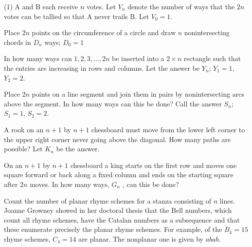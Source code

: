 \documentclass[10pt,]{book}
\theoremstyle{plain}
\theoremstyle{definition}
\theoremstyle{definition}
\theoremstyle{definition}
\theoremstyle{definition}
\numberwithin{equation}{chapter}
\begin{document}
\begin{exercisegroup}(1)
\exercise[13.] \hypertarget{exercise-63}{}
\hypertarget{p-823}{}%
A and B each receive \(n\) votes. Let \(V_{n}\) denote the number of ways that the \(2n\) votes can be tallied so that A never trails B. Let \(V_{0} = 1\).%

\exercise[14.] \hypertarget{exercise-64}{}
\hypertarget{p-824}{}%
Place \(2n\) points on the circumference of a circle and draw \(n\)  nonintersecting chords in \(D_{n}\) ways; \(D_{0} = 1\)%

\exercise[15.] \hypertarget{exercise-65}{}
\hypertarget{p-825}{}%
In how many ways can \(1, 2, 3, \ldots, 2n\) be inserted into a \(2\times n\) rectangle such that the entries are increasing in rows and columns.  Let the answer be \(Y_n\); \(Y_1 = 1\), \(Y_2 = 2\).%

\exercise[16.] \hypertarget{exercise-66}{}
\hypertarget{p-826}{}%
Place \(2n\) points on a line segment and join them in pairs by nonintersecting arcs above the segment. In how many ways can this be done? Call the answer \(S_{n}\); \(S_{1}=1\), \(S_{2}=2\).%

\exercise[17.] \hypertarget{exercise-67}{}
\hypertarget{p-827}{}%
A rook on an \(n + 1\) by \(n + 1\) chessboard must move from the lower left corner to the upper right corner never going above the diagonal. How many paths are possible? Let \(K_{n}\) be the answer.%

\exercise[18.] \hypertarget{exercise-68}{}
\hypertarget{p-828}{}%
On an \(n + 1\) by \(n + 1\) chessboard a king starts on the first row and moves one square forward or back along a fixed column and ends on the starting square after \(2n\) moves. In how many ways, \(G_{n}\) , can this be done?%

\exercise[19.] \hypertarget{exercise-69}{}
\hypertarget{p-829}{}%
Count the number of planar rhyme schemes for a stanza consisting of \(n\) lines. Joanne Growney showed in her doctoral thesis that the Bell numbers, which count all rhyme schemes, have the Catalan numbers as a subsequence and that these enumerate precisely the planar rhyme schemes. For example, of the \(B_4 = 15\) rhyme schemes, \(C_4 = 14\) are planar. The nonplanar one is given by \(abab\).%

\end{exercisegroup}\par\medskip\noindent
\typeout{************************************************}
\typeout{************************************************}
\end{document}
